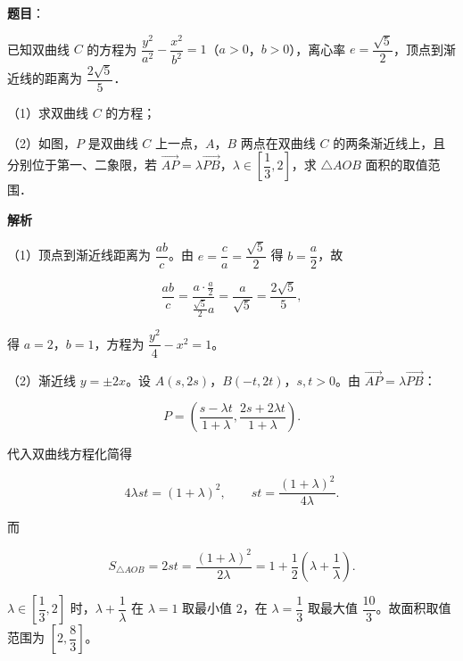 \begin{answer}

\textbf{题目}：

已知双曲线 $C$ 的方程为 $\dfrac{y^2}{a^2}-\dfrac{x^2}{b^2}=1$（$a>0$，$b>0$），离心率 $e=\dfrac{\sqrt5}2$，顶点到渐近线的距离为 $\dfrac{2\sqrt5}5$．

（1）求双曲线 $C$ 的方程；

（2）如图，$P$ 是双曲线 $C$ 上一点，$A$，$B$ 两点在双曲线 $C$ 的两条渐近线上，且分别位于第一、二象限，若 $\overrightarrow{AP}=\lambda\overrightarrow{PB}$，$\lambda\in\left[\dfrac13,2\right]$，求 $\triangle AOB$ 面积的取值范围．
\nopagebreak[4]
\begin{center}\end{center}
\nopagebreak[4]
\textbf{解析}

（1）顶点到渐近线距离为 $\dfrac{ab}c$。由 $e=\dfrac ca=\dfrac{\sqrt5}2$ 得 $b=\dfrac a2$，故

\nopagebreak[4]
\[\frac{ab}c=\frac{a\cdot\frac a2}{\frac{\sqrt5}2a}=\frac a{\sqrt5}=\frac{2\sqrt5}5,\]

得 $a=2$，$b=1$，方程为 $\dfrac{y^2}4-x^2=1$。

（2）渐近线 $y=\pm2x$。设 $A(s,2s)$，$B(-t,2t)$，$s,t>0$。由 $\overrightarrow{AP}=\lambda\overrightarrow{PB}$：

\nopagebreak[4]
\[P=\left(\frac{s-\lambda t}{1+\lambda},\frac{2s+2\lambda t}{1+\lambda}\right).\]

代入双曲线方程化简得

\nopagebreak[4]
\[4\lambda st=(1+\lambda)^2,\qquad st=\frac{(1+\lambda)^2}{4\lambda}.\]

而

\nopagebreak[4]
\[S_{\triangle AOB}=2st=\frac{(1+\lambda)^2}{2\lambda}
=1+\frac12\left(\lambda+\frac1\lambda\right).\]

$\lambda\in\left[\dfrac13,2\right]$ 时，$\lambda+\dfrac1\lambda$ 在 $\lambda=1$ 取最小值 $2$，在 $\lambda=\dfrac13$ 取最大值 $\dfrac{10}3$。故面积取值范围为 $\left[2,\dfrac83\right]$。


\end{answer}
